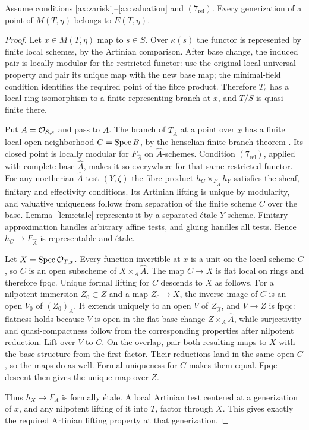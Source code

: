 \begin{lemma}\label{lem:generization}
Assume conditions \ref{ax:zariski}--\ref{ax:valuation} and $(7_{\mathrm{rel}})$. Every generization of a point of $M(T,\eta)$ belongs to $E(T,\eta)$.
\end{lemma}
\begin{proof}
Let $x\in M(T,\eta)$ map to $s\in S$. Over $\kappa(s)$ the functor is represented by finite local schemes, by the Artinian comparison. After base change, the induced pair is locally modular for the restricted functor: use the original local universal property and pair its unique map with the new base map; the minimal-field condition identifies the required point of the fibre product. Therefore $T_s$ has a local-ring isomorphism to a finite representing branch at $x$, and $T/S$ is quasi-finite there.

Put $A=\mathcal O_{S,s}$ and pass to $\widehat A$. The branch of $T_{\widehat A}$ at a point over $x$ has a finite local open neighborhood $C=\operatorname{Spec} B$, by the henselian finite-branch theorem \cite[Tag 04GH]{Stacks}. Its closed point is locally modular for $F_{\widehat A}$ on $\widehat A$-schemes. Condition $(7_{\mathrm{rel}})$, applied with complete base $\widehat A$, makes it so everywhere for that same restricted functor. For any noetherian $\widehat A$-test $(Y,\zeta)$ the fibre product $h_C\times_{F_{\widehat A}}h_Y$ satisfies the sheaf, finitary and effectivity conditions. Its Artinian lifting is unique by modularity, and valuative uniqueness follows from separation of the finite scheme $C$ over the base. Lemma~\ref{lem:etale} represents it by a separated \'etale $Y$-scheme. Finitary approximation handles arbitrary affine tests, and gluing handles all tests. Hence $h_C\to F_{\widehat A}$ is representable and \'etale.

Let $X=\operatorname{Spec}\mathcal O_{T,x}$. Every function invertible at $x$ is a unit on the local scheme $C$, so $C$ is an open subscheme of $X\times_A\widehat A$. The map $C\to X$ is flat local on rings and therefore fpqc. Unique formal lifting for $C$ descends to $X$ as follows. For a nilpotent immersion $Z_0\subset Z$ and a map $Z_0\to X$, the inverse image of $C$ is an open $V_0$ of $(Z_0)_{\widehat A}$. It extends uniquely to an open $V$ of $Z_{\widehat A}$, and $V\to Z$ is fpqc: flatness holds because $V$ is open in the flat base change $Z\times_A\widehat A$, while surjectivity and quasi-compactness follow from the corresponding properties after nilpotent reduction. Lift over $V$ to $C$. On the overlap, pair both resulting maps to $X$ with the base structure from the first factor. Their reductions land in the same open $C$, so the maps do as well. Formal uniqueness for $C$ makes them equal. Fpqc descent then gives the unique map over $Z$.

Thus $h_X\to F_A$ is formally \'etale. A local Artinian test centered at a generization of $x$, and any nilpotent lifting of it into $T$, factor through $X$. This gives exactly the required Artinian lifting property at that generization.
\end{proof}

